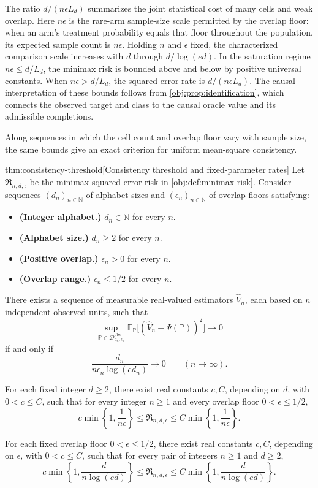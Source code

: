 The ratio \(d/(n\epsilon L_d)\) summarizes the joint statistical cost of many cells and weak overlap. Here \(n\epsilon\) is the rare-arm sample-size scale permitted by the overlap floor: when an arm's treatment probability equals that floor throughout the population, its expected sample count is \(n\epsilon\). Holding \(n\) and \(\epsilon\) fixed, the characterized comparison scale increases with \(d\) through \(d/\log(ed)\). In the saturation regime \(n\epsilon\le d/L_d\), the minimax risk is bounded above and below by positive universal constants. When \(n\epsilon>d/L_d\), the squared-error rate is \(d/(n\epsilon L_d)\). The causal interpretation of these bounds follows from \cref{obj:prop:identification}, which connects the observed target and class to the causal oracle value and its admissible completions.

Along sequences in which the cell count and overlap floor vary with sample size, the same bounds give an exact criterion for uniform mean-square consistency.

\begin{theoremv}{thm:consistency-threshold}[Consistency threshold and fixed-parameter rates]
Let \(\mathfrak R_{n,d,\epsilon}\) be the minimax squared-error risk in \cref{obj:def:minimax-risk}. Consider sequences \((d_n)_{n\in\mathbb N}\) of alphabet sizes and \((\epsilon_n)_{n\in\mathbb N}\) of overlap floors satisfying:
\begin{itemize}
\item \textbf{(Integer alphabet.)} \(d_n\in\mathbb N\) for every \(n\).
\item \textbf{(Alphabet size.)} \(d_n\ge2\) for every \(n\).
\item \textbf{(Positive overlap.)} \(\epsilon_n>0\) for every \(n\).
\item \textbf{(Overlap range.)} \(\epsilon_n\le1/2\) for every \(n\).
\end{itemize}
There exists a sequence of measurable real-valued estimators \(\widehat V_n\), each based on \(n\) independent observed units, such that
\[
\sup_{\mathbb P\in\mathcal D_{d_n,\epsilon_n}^{\mathrm{obs}}}
\mathbb E_{\mathbb P}
\bigl[(\widehat V_n-\Psi(\mathbb P))^2\bigr]
\longrightarrow0
\]
if and only if
\[
\frac{d_n}{n\epsilon_n\log(e d_n)}
\longrightarrow0
\qquad (n\to\infty).
\]

For each fixed integer \(d\ge2\), there exist real constants \(c,C\), depending on \(d\), with \(0<c\le C\), such that for every integer \(n\ge1\) and every overlap floor \(0<\epsilon\le1/2\),
\[
c\min\left\{1,\frac{1}{n\epsilon}\right\}
\le \mathfrak R_{n,d,\epsilon}
\le C\min\left\{1,\frac{1}{n\epsilon}\right\}.
\]

For each fixed overlap floor \(0<\epsilon\le1/2\), there exist real constants \(c,C\), depending on \(\epsilon\), with \(0<c\le C\), such that for every pair of integers \(n\ge1\) and \(d\ge2\),
\[
c\min\left\{1,\frac{d}{n\log(e d)}\right\}
\le \mathfrak R_{n,d,\epsilon}
\le C\min\left\{1,\frac{d}{n\log(e d)}\right\}.
\]
\end{theoremv}

